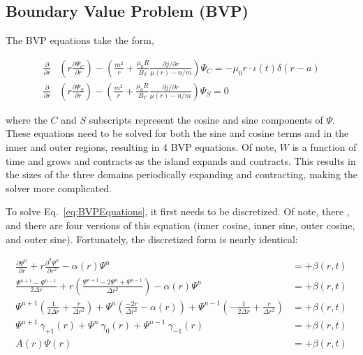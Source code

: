 \documentclass{article}
\begin{document}
\subsection{Boundary Value Problem (BVP)}


The BVP equations take the form,


\begin{equation} \label{eq:BVPEquations}
\begin{split}
\frac{\partial}{\partial r} &  \left( r \frac{\partial \Psi_C}{\partial r} \right)-\left( \frac{m^2}{r} +\frac{\mu_0 R}{B_T} \frac{\partial j / \partial r}{\mu(r)-n/m} \right) \Psi_C  = - \mu_0r \cdot \iota(t) \delta (r-a)  \\
 \frac{\partial}{\partial r} &  \left( r \frac{\partial \Psi_S}{\partial r} \right)-\left( \frac{m^2}{r} +\frac{\mu_0 R}{B_T} \frac{\partial j / \partial r}{\mu(r)-n/m} \right) \Psi_S =0
\end{split}
\end{equation}

\noindent where the $C$ and $S$ subscripts represent the cosine and sine components of $\Psi$.  These equations need to be solved for both the sine and cosine terms and in the inner and outer regions, resulting in 4 BVP equations.  Of note, $W$ is a function of time and grows and contracts as the island expands and contracts.  This results in the sizes of the three domains periodically expanding and contracting, making the solver more complicated.   

To solve Eq.~\ref{eq:BVPEquations}, it first needs to be discretized.  Of note, there , and there are four versions of this equation (inner cosine, inner sine, outer cosine, and outer sine).  Fortunately, the discretized form is nearly identical:



\begin{equation} \label{eq:BVPSolved}
\begin{split}
 \frac{\partial \Psi^n}{\partial r} + r \frac{\partial^2 \Psi^n}{\partial r^2} -\alpha(r)  \Psi^n  & = + \beta(r,t) \\ 
 \frac{\Psi^{n+1}-\Psi^{n-1}}{2\Delta r}+r\left(\frac{\Psi^{n+1}-2\Psi^{n}+\Psi^{n-1}}{\Delta r^2}\right)-\alpha(r)\Psi^n & = + \beta(r,t)  \\
  \Psi^{n+1}\left(\frac{1}{2 \Delta r}+\frac{r}{\Delta r^2 }\right) + \Psi^n\left( \frac{-2r}{\Delta r^2} -\alpha(r) \right) + \Psi^{n-1}\left(-\frac{1}{2\Delta r} + \frac{r}{\Delta r^2} \right) & = + \beta(r,t) \\
  \Psi^{n+1} \ \gamma_{+1}(r) + \Psi^n \ \gamma_{0}(r) + \Psi^{n-1} \ \gamma_{-1}(r) & = + \beta(r,t) \\
A(r) \Psi(r) & = +\beta(r,t) \\
\end{split}
\end{equation}
\end{document}
